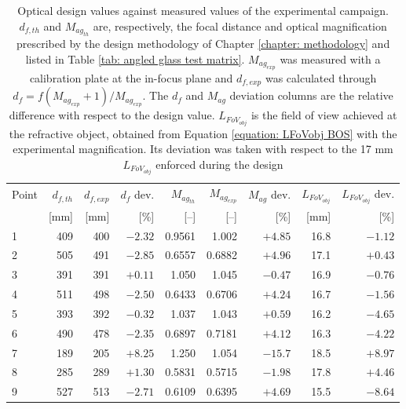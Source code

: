 \begin{table}[htbp]
    \centering
    \caption[Design against measured focal distance and magnification]{Optical design values against measured values of the experimental campaign. $d_{f,th}$ and $M_{ag_{th}}$ are, respectively, the focal distance and optical magnification prescribed by the design methodology of Chapter \ref{chapter: methodology} and listed in Table \ref{tab: angled glass test matrix}. $M_{ag_{exp}}$ was measured with a calibration plate at the in-focus plane and $d_{f,exp}$ was calculated through $d_f = f(M_{ag_{exp}}+1)/M_{ag_{exp}}$. The $d_f$ and $M_{ag}$ deviation columns are the relative difference with respect to the design value. $L_{FoV_{obj}}$ is the field of view achieved at the refractive object, obtained from Equation \ref{equation: LFoVobj BOS} with the experimental magnification. Its deviation was taken with respect to the 17 mm $L_{FoV_{obj}}$ enforced during the design}
    \label{tab: df and Mag angled glass results}
    \begin{tabular}{lrrrrrrrr}
        \toprule
        Point & $d_{f,th}$ & $d_{f,exp}$ & $d_f$ dev. & $M_{ag_{th}}$ & $M_{ag_{exp}}$ & $M_{ag}$ dev. & $L_{FoV_{obj}}$ & $L_{FoV_{obj}}$ dev. \\
              & [mm] & [mm] & [\%] & [--] & [--] & [\%] & [mm] & [\%] \\
        \midrule
        1 & 409 & 400 & $-2.32$ & 0.9561 & 1.002 &  $+4.85$ & 16.8 & $-1.12$ \\
        2 & 505 & 491 & $-2.85$ & 0.6557 & 0.6882 &  $+4.96$ & 17.1 & $+0.43$ \\
        3 & 391 & 391 & $+0.11$ & 1.050 & 1.045 &  $-0.47$ & 16.9 & $-0.76$ \\
        4 & 511 & 498 & $-2.50$ & 0.6433 & 0.6706 &  $+4.24$ & 16.7 & $-1.56$ \\
        5 & 393 & 392 & $-0.32$ & 1.037 & 1.043 &  $+0.59$ & 16.2 & $-4.65$ \\
        6 & 490 & 478 & $-2.35$ & 0.6897 & 0.7181 &  $+4.12$ & 16.3 & $-4.22$ \\
        7 & 189 & 205 & $+8.25$ & 1.250 & 1.054 & $-15.7$ & 18.5 & $+8.97$ \\
        8 & 285 & 289 & $+1.30$ & 0.5831 & 0.5715 &  $-1.98$ & 17.8 & $+4.46$ \\
        9 & 527 & 513 & $-2.71$ & 0.6109 & 0.6395 &  $+4.69$ & 15.5 & $-8.64$ \\
        \bottomrule
    \end{tabular}
\end{table}

